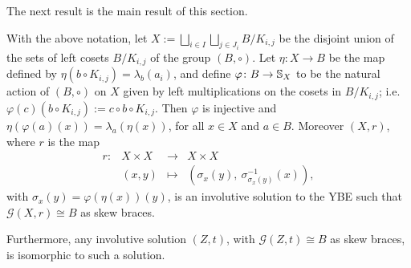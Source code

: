 The next result  is the main result of this section.


\begin{theorem}\label{main}
	With the above notation,  let  $X:=\bigsqcup_{i\in I}\bigsqcup_{j\in
		J_i}B/K_{i,j}$ be the disjoint union of the sets of left cosets
	$B/K_{i,j}$ of the group $(B,\circ)$. Let $\eta\colon X\to B$ be the map
	defined by $\eta(b\circ K_{i,j})=\lambda_b(a_i)$, and define $\varphi\colon
	B\to  \mathbb{S}_{X}$ to be the natural action of $(B,\circ)$
	on $X$ given by left multiplications on the cosets in $B/K_{i,j}$;
	i.e. $\varphi(c)(b\circ K_{i,j}):=c\circ b\circ K_{i,j}$. Then $\varphi$ is injective
	and $\eta(\varphi(a)(x))=\lambda_a(\eta(x))$, for all $x\in X$ and $a\in B$.
	Moreover $(X,r)$, where $r$ is the map
	$$
	\begin{array}{cccc}
		r\colon& X\times X &\to & X\times X\\
		& (x,y) &\mapsto &(\sigma_{x}(y),~\sigma^{-1}_{\sigma_{x}(y)}(x)),
	\end{array}
	$$
	with
	$\sigma_{x}(y)=\varphi(\eta(x))(y)$, is an involutive solution to the YBE such that
	$\mathcal{G}(X,r)\cong B$ as skew braces.
	
	Furthermore, any involutive solution $(Z,t)$, with $\mathcal{G}(Z,t)\cong
	B$ as skew braces, is isomorphic to  such a solution.
\end{theorem}

